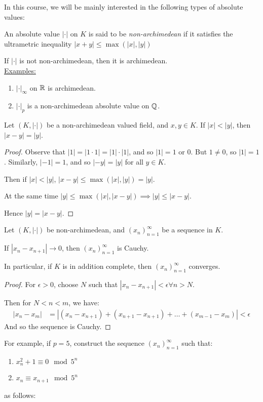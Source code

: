 \documentclass[10pt,a4paper]{article}
\begin{document}
In this course, we will be mainly interested in the following types of absolute values:
\begin{definition}
  An absolute value $|\cdot|$ on $K$ is said to be \emph{non-archimedean} if it satisfies the ultrametric inequality $|x+y| \leq \max(|x|, |y|)$
\end{definition}
If $|\cdot|$ is not non-archimedean, then it is archimedean.\\
\underline{Examples: }
\begin{enumerate}
  \item $|\cdot|_\infty$ on $\mathbb{R}$ is archimedean.
  \item $|\cdot|_p$ is a non-archimedean absolute value on $\mathbb{Q}$.
\end{enumerate}
\begin{lemma}
    Let $(K, |\cdot|)$ be a non-archimedean valued field, and $x, y \in K$. If $|x|<|y|$, then $|x-y| = |y|$.
\end{lemma}
\begin{proof}
  Observe that $|1| = |1\cdot 1| = |1|\cdot |1|$, and so $|1| = 1$ or $0$. But $1 \neq 0$, so $|1| = 1$. Similarly, $|-1| = 1$, and so $|-y| = |y|$ for all $y \in K$.

  Then if $|x| < |y|$,  $|x-y| \leq \max(|x|, |y|) = |y|$.

  At the same time $|y| \leq \max(|x|, |x-y|) \implies |y| \leq |x-y|$.

  Hence $|y| = |x-y|$.
\end{proof}

\begin{proposition}
  Let $(K, |\cdot|)$ be non-archimedean, and $(x_n)_{n=1}^\infty$ be a sequence in $K$.

  If $|x_n-x_{n+1}| \to 0$, then $(x_n)_{n=1}^\infty$ is Cauchy.

  In particular, if $K$ is in addition complete, then $(x_n)_{n=1}^\infty$ converges.
\end{proposition}
\begin{proof}
  For $\epsilon > 0$, choose $N$ such that $|x_n - x_{n+1}| < \epsilon\forall n>N$.

  Then for $N < n < m$, we have:
  \begin{align*}
    |x_n-x_m| &= |(x_n-x_{n+1}) + (x_{n+1}-x_{n+1}) +\ldots + (x_{m-1} - x_m)| < \epsilon
  \end{align*}
  And so the sequence is Cauchy.
\end{proof}

For example, if $p=5$, construct the sequence $(x_n)_{n=1}^\infty$ such that:
\begin{enumerate}
  \item $x_n^2+ 1\equiv 0 \mod 5^n$
  \item $x_n \equiv x_{n+1} \mod 5^n$
\end{enumerate}
as follows:
\end{document}
